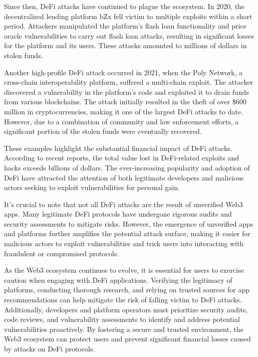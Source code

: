 \documentclass[11pt]{article}
\begin{document}
Since then, DeFi attacks have continued to plague the ecosystem. In 2020, the decentralized lending platform bZx fell victim to multiple exploits within a short period. Attackers manipulated the platform's flash loan functionality and price oracle vulnerabilities to carry out flash loan attacks, resulting in significant losses for the platform and its users. These attacks amounted to millions of dollars in stolen funds.


Another high-profile DeFi attack occurred in 2021, when the Poly Network, a cross-chain interoperability platform, suffered a multi-chain exploit. The attacker discovered a vulnerability in the platform's code and exploited it to drain funds from various blockchains. The attack initially resulted in the theft of over \$600 million in cryptocurrencies, making it one of the largest DeFi attacks to date. However, due to a combination of community and law enforcement efforts, a significant portion of the stolen funds were eventually recovered.


These examples highlight the substantial financial impact of DeFi attacks. According to recent reports, the total value lost in DeFi-related exploits and hacks exceeds billions of dollars. The ever-increasing popularity and adoption of DeFi have attracted the attention of both legitimate developers and malicious actors seeking to exploit vulnerabilities for personal gain.


It's crucial to note that not all DeFi attacks are the result of unverified Web3 apps. Many legitimate DeFi protocols have undergone rigorous audits and security assessments to mitigate risks. However, the emergence of unverified apps and platforms further amplifies the potential attack surface, making it easier for malicious actors to exploit vulnerabilities and trick users into interacting with fraudulent or compromised protocols.


As the Web3 ecosystem continues to evolve, it is essential for users to exercise caution when engaging with DeFi applications. Verifying the legitimacy of platforms, conducting thorough research, and relying on trusted sources for app recommendations can help mitigate the risk of falling victim to DeFi attacks. Additionally, developers and platform operators must prioritize security audits, code reviews, and vulnerability assessments to identify and address potential vulnerabilities proactively. By fostering a secure and trusted environment, the Web3 ecosystem can protect users and prevent significant financial losses caused by attacks on DeFi protocols.
\end{document}
